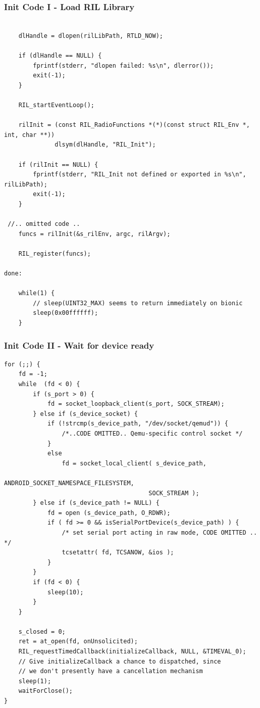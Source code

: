 \documentclass{beamer}
\begin{document}
\begin{frame}[fragile]
    \frametitle{Init Code I - Load RIL Library}
    \lstset{language=C}
  \begin{lstlisting}

    dlHandle = dlopen(rilLibPath, RTLD_NOW);

    if (dlHandle == NULL) {
        fprintf(stderr, "dlopen failed: %s\n", dlerror());
        exit(-1);
    }

    RIL_startEventLoop();

    rilInit = (const RIL_RadioFunctions *(*)(const struct RIL_Env *, int, char **))
              dlsym(dlHandle, "RIL_Init");

    if (rilInit == NULL) {
        fprintf(stderr, "RIL_Init not defined or exported in %s\n", rilLibPath);
        exit(-1);
    }

 //.. omitted code .. 
    funcs = rilInit(&s_rilEnv, argc, rilArgv);

    RIL_register(funcs);

done:

    while(1) {
        // sleep(UINT32_MAX) seems to return immediately on bionic
        sleep(0x00ffffff);
    }
  \end{lstlisting}
\end{frame}

\begin{frame}[fragile]
    \frametitle{Init Code II - Wait for device ready}
    \lstset{language=C}
  \begin{lstlisting}
for (;;) {
    fd = -1;
    while  (fd < 0) {
        if (s_port > 0) {
            fd = socket_loopback_client(s_port, SOCK_STREAM);
        } else if (s_device_socket) {
            if (!strcmp(s_device_path, "/dev/socket/qemud")) {
                /*..CODE OMITTED.. Qemu-specific control socket */
            }
            else
                fd = socket_local_client( s_device_path,
                                        ANDROID_SOCKET_NAMESPACE_FILESYSTEM,
                                        SOCK_STREAM );
        } else if (s_device_path != NULL) {
            fd = open (s_device_path, O_RDWR);
            if ( fd >= 0 && isSerialPortDevice(s_device_path) ) { 
                /* set serial port acting in raw mode, CODE OMITTED .. */
                tcsetattr( fd, TCSANOW, &ios );
            }
        }
        if (fd < 0) {
            sleep(10);
        }
    }

    s_closed = 0;
    ret = at_open(fd, onUnsolicited);
    RIL_requestTimedCallback(initializeCallback, NULL, &TIMEVAL_0);
    // Give initializeCallback a chance to dispatched, since
    // we don't presently have a cancellation mechanism
    sleep(1);
    waitForClose();
}
  \end{lstlisting}
\end{frame}
\end{document}
